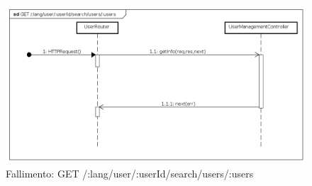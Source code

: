 \begin{itemize}
\begin{figure}[ht]
	\centering
	\includegraphics[scale=0.45]{UML/DiagrammiDiSequenza/Back-end/GET__lang_user__userId_search_users__users_failure.png}
	\caption{Fallimento: GET /:lang/user/:userId/search/users/:users}
\end{figure}
\FloatBarrier

\end{itemize}





